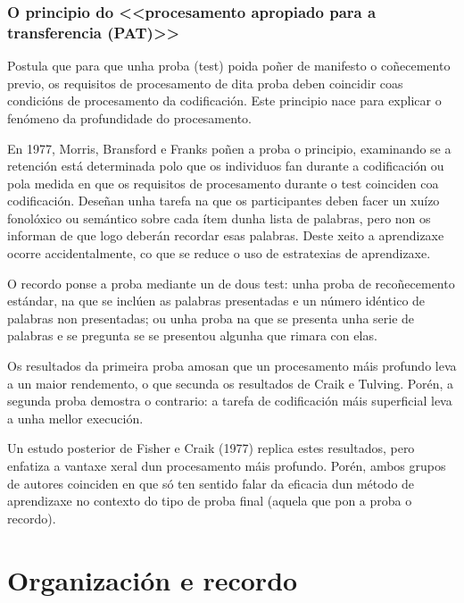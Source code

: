 \documentclass[a4paper,11pt]{article}
\begin{document}
\subsubsection{O principio do <<procesamento apropiado para a transferencia (PAT)>>}
Postula que para que unha proba (test) poida poñer de manifesto o coñecemento previo, os requisitos de procesamento de dita proba deben coincidir coas condicións de procesamento da codificación. Este principio nace para explicar o fenómeno da profundidade do procesamento.

En 1977, Morris, Bransford e Franks poñen a proba o principio, examinando se a retención está determinada polo que os individuos fan durante a codificación ou pola medida en que os requisitos de procesamento durante o test coinciden coa codificación. Deseñan unha tarefa na que os participantes deben facer un xuízo fonolóxico ou semántico sobre cada ítem dunha lista de palabras, pero non os informan de que logo deberán recordar esas palabras. Deste xeito a aprendizaxe ocorre accidentalmente, co que se reduce o uso de estratexias de aprendizaxe.

O recordo ponse a proba mediante un de dous test: unha proba de recoñecemento estándar, na que se inclúen as palabras presentadas e un número idéntico de palabras non presentadas; ou unha proba na que se presenta unha serie de palabras e se pregunta se se presentou algunha que rimara con elas. 

Os resultados da primeira proba amosan que un procesamento máis profundo leva a un maior rendemento, o que secunda os resultados de Craik e Tulving. Porén, a segunda proba demostra o contrario: a tarefa de codificación máis superficial leva a unha mellor execución.

Un estudo posterior de Fisher e Craik (1977) replica estes resultados, pero enfatiza a vantaxe xeral dun procesamento máis profundo. Porén, ambos grupos de autores coinciden en que só ten sentido falar da eficacia dun método de aprendizaxe no contexto do tipo de proba final (aquela que pon a proba o recordo).


\section{Organización e recordo}
\end{document}
